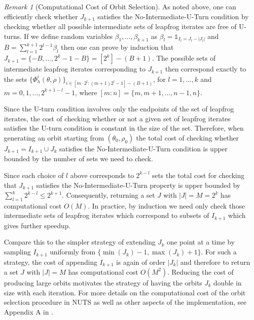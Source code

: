 \documentclass[letterpaper,11pt]{article}
\theoremstyle{plain}%
\theoremstyle{remark}
\newtheorem{remark}{Remark}
\begin{document}
\begin{remark}[Computational Cost of Orbit Selection] \label{rmk:orbit-selection-complexity} As noted above, one can efficiently check whether $J_{k+1}$ satisfies the No-Intermediate-U-Turn condition by checking whether all possible intermediate sets of leapfrog iterates are free of U-turns. If we define random variables $\beta_1, \dots, \beta_{k+1}$ as $\beta_l = \mathds{1}_{I_{l} = J_l - |J_l|}$ and $B = \sum_{l=1}^{k+1} 2^{l-1} \beta_l$ then one can prove by induction that $J_{k+1} = \{-B, \dots, 2^k -1-B \} = [2^k] - (B+1)$. The possible sets of intermediate leapfrog iterates corresponding to $J_{k+1}$ then correspond exactly to the sets $\{\Phi_h^i(\theta, \rho)\}_{i \in [m\cdot 2^l : (m+1)2^l -1] - (B+1) } $, for $l=1, \dots, k$ and $m = 0, 1, \dots, 2^{k+1-l} - 1$,  where ${[m : n ] = \{m, m+1, \dots, n-1, n \}}$. 

Since the U-turn condition involves only the endpoints of the set of leapfrog iterates, the cost of checking whether or not a given set of leapfrog iterates satisfies the U-turn condition is constant in the size of the set. Therefore, when generating an orbit starting from $(\theta_0, \rho_0)$ the total cost of checking whether $J_{k+1} = I_{k+1} \cup J_k$ satisfies the No-Intermediate-U-Turn condition is upper bounded by the number of sets we need to check. 


Since each choice of $l$ above corresponds to $2^{k-l}$ sets the total cost for checking that $J_{k+1}$ satisfies the No-Intermediate-U-Turn property is upper bounded by $\sum_{l=1}^{k} 2^{k-l} \leq 2^{k+1}$. Consequently, returning a set $J$ with $|J| = M = 2^k$ has computational cost $O(M)$. In practice, by induction we need only check those intermediate sets of leapfrog iterates which correspond to subsets of $I_{k+1}$ which gives further speedup.

Compare this to the simpler strategy of extending $J_k$ one point at a time by sampling $I_{k+1}$ uniformly from $\{\min(J_k) -1, \max(J_k)+1 \}$. For such a strategy, the cost of appending $I_{k+1}$ is again of order $|J_k|$ and therefore to return a set $J$ with $|J| = M$ has computational cost $O(M^2)$. Reducing the cost of producing large orbits motivates the strategy of having the orbits $J_k$ double in size with each iteration. For more details on the computational cost of the orbit selection procedure in NUTS as well as other aspects of the implementation, see Appendix A in \cite{betancourt2017conceptual}.




\end{remark}
\end{document}

